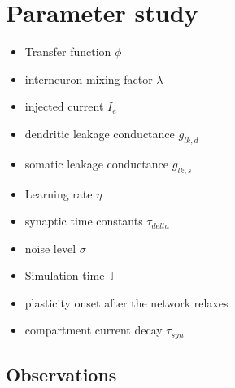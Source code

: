 \documentclass[12pt,a4paper,titlepage]{report}
\begin{document}
\section{Parameter study}
\begin{itemize}

  \item Transfer function $\phi$
  \item interneuron mixing factor $\lambda$
  \item injected current $I_e$
  \item dendritic leakage conductance $g_{lk,d}$
  \item somatic leakage conductance $g_{lk,s}$
  \item Learning rate $\eta$
  \item synaptic time constants $\tau_{delta}$
  \item noise level $\sigma$
  \item Simulation time $\mathbb{T}$
  \item plasticity onset after the network relaxes
  \item compartment current decay $\tau_{syn}$

\end{itemize}


\subsection*{Observations}
\end{document}
